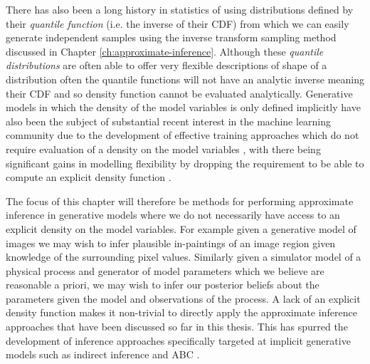 There has also been a long history in statistics of using distributions defined by their \emph{quantile function} (i.e. the inverse of their \ac{CDF}) \citep{hastings1947low,tukey1960practical} from which we can easily generate independent samples using the inverse transform sampling method discussed in Chapter \ref{ch:approximate-inference}. Although these \emph{quantile distributions} are often able to offer very flexible descriptions of shape of a distribution \citep{gilchrist2000statistical} 
often the quantile functions will not have an analytic inverse meaning their \ac{CDF} and so density function cannot be evaluated analytically. Generative models in which the density of the model variables is only defined implicitly have also been the subject of substantial recent interest in the machine learning community due to the development of effective training approaches which do not require evaluation of a density on the model variables \citep{li2015generative,dziugaite2015training,goodfellow2014generative}, with there being significant gains in modelling flexibility by dropping the requirement to be able to compute an explicit density function \citep{mohamed2016learning,tran2017deep}.


The focus of this chapter will therefore be methods for performing approximate inference in generative models where we do not necessarily have access to an explicit density on the model variables. 
For example given a generative model of images we may wish to infer plausible in-paintings of an image region given knowledge of the surrounding pixel values. Similarly given a simulator model of a physical process and generator of model parameters which we believe are reasonable a priori, we may wish to infer our posterior beliefs about the parameters given the model and observations of the process. A lack of an explicit density function makes it non-trivial to directly apply the approximate inference approaches that have been discussed so far in this thesis. This has spurred the development of inference approaches specifically targeted at implicit generative models such as indirect inference \citep{gourieroux1993indirect} and \ac{ABC} \citep{beaumont2002approximate}.%
 
